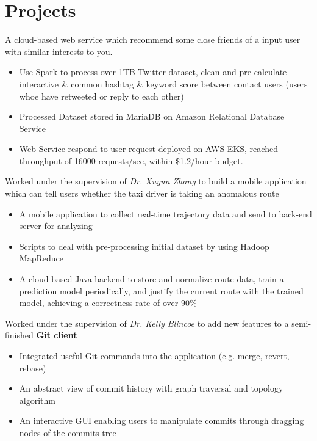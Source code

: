 \documentclass{resume}
\begin{document}
\section{Projects}
\begin{flushleft}

A cloud-based web service which recommend some close friends of a input user with similar interests to you.
\begin{itemize}
    \item Use Spark to process over 1TB Twitter dataset, clean and pre-calculate interactive \& common hashtag \linebreak \& keyword score between contact users (users whoe have retweeted or reply to each other)
    \item Processed Dataset stored in MariaDB on Amazon Relational Database Service
    \item Web Service respond to user request deployed on AWS EKS, reached throughput of 16000 requests/sec, within \$1.2/hour budget.
\end{itemize}

Worked under the supervision of \textit{Dr. Xuyun Zhang} to build a mobile application which can tell users whether \linebreak the taxi driver is taking an anomalous route
\begin{itemize}
    \item A mobile application to collect real-time trajectory data and send to back-end server for analyzing
    \item Scripts to deal with pre-processing initial dataset by using Hadoop MapReduce
    \item A cloud-based Java backend to store and normalize route data, train a prediction model periodically, \linebreak and justify the current route with the trained model, achieving a correctness rate of over 90\%
\end{itemize}

Worked under the supervision of \textit{Dr. Kelly Blincoe} to add new features to a semi-finished \textbf{Git client}
\begin{itemize}
    \item Integrated useful Git commands into the application (e.g. merge, revert, rebase)
    \item An abstract view of commit history with graph traversal and topology algorithm
    \item An interactive GUI enabling users to manipulate commits through dragging nodes of the commits tree
\end{itemize}
\end{flushleft}
\end{document}
